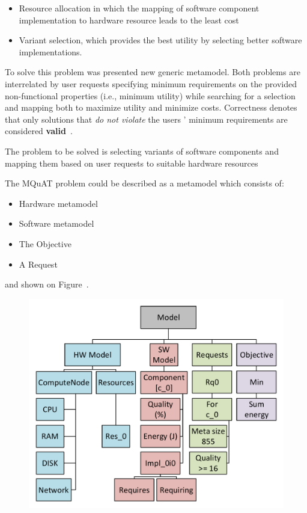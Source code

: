 \begin{itemize}
	\item Resource allocation in which the mapping of software component implementation to hardware resource leads to the least cost
	\item Variant selection, which provides the best utility by selecting better software implementations.
\end{itemize} 

To solve this problem was presented new generic metamodel. Both problems are interrelated by user requests specifying minimum requirements on the provided non-functional properties (i.e., minimum utility) while searching for a selection and mapping both to maximize utility and minimize costs. Correctness denotes that only solutions that \textit{do not violate} the users ' minimum requirements are considered \textbf{valid}~\cite{gotz18}.

The problem to be solved is selecting variants of software components and mapping them based on user requests to suitable hardware resources~\cite{gotz18}

The MQuAT problem could be described as a metamodel which consists of:
\begin{itemize}
	\item Hardware metamodel
	\item Software metamodel
	\item The Objective
	\item A Request
\end{itemize}
and shown on Figure~\label{fig:mquatmodel}.
\begin{figure}
	\centering
	\includegraphics[width=\textwidth]{images/MQuATModel}
	\caption{}
	\label{fig:mquatmodel}
\end{figure}


